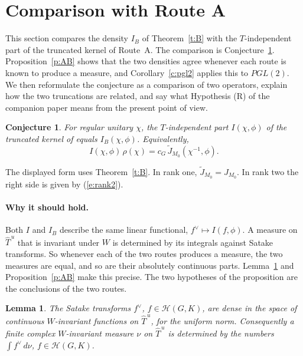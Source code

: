 \documentclass[12pt,letterpaper]{article}
\numberwithin{equation}{section}
\theoremstyle{plain}
\newtheorem{lemma}[theorem]{Lemma}
\newtheorem{conjecture}[theorem]{Conjecture}
\theoremstyle{definition}
\theoremstyle{remark}
\newcommand{\Hc}{\mathcal{H}}
\newcommand{\Thu}{\widehat{T}^{\,u}}
\begin{document}
\section{Comparison with Route A}\label{s:compare}

This section compares the density $I_B$ of Theorem~\ref{t:B} with the $T$-independent part of the truncated kernel of Route~A. The comparison is Conjecture~\ref{c:AB}. Proposition~\ref{p:AB} shows that the two densities agree whenever each route is known to produce a measure, and Corollary~\ref{c:pgl2} applies this to $PGL(2)$. We then reformulate the conjecture as a comparison of two operators, explain how the two truncations are related, and say what Hypothesis (R) of the companion paper means from the present point of view.

\begin{conjecture}\label{c:AB}
For regular unitary $\chi$, the $T$-independent part $I(\chi,\phi)$ of the truncated kernel of \cite[Prop.~4.2]{JC26} equals $I_B(\chi,\phi)$. Equivalently,
\[
I(\chi,\phi)\,\rho(\chi)=c_G\,\widetilde J_{M_0}(\chi^{-1},\phi).
\]
\end{conjecture}

The displayed form uses Theorem~\ref{t:B}. In rank one, $\widetilde J_{M_0}=J_{M_0}$. In rank two the right side is given by (\ref{e:rank2}).

\paragraph{Why it should hold.} Both $I$ and $I_B$ describe the same linear functional, $f^\vee\mapsto I(f,\phi)$. A measure on $\Thu$ that is invariant under $W$ is determined by its integrals against Satake transforms. So whenever each of the two routes produces a measure, the two measures are equal, and so are their absolutely continuous parts. Lemma~\ref{l:dense} and Proposition~\ref{p:AB} make this precise. The two hypotheses of the proposition are the conclusions of the two routes.

\begin{lemma}\label{l:dense}
The Satake transforms $f^\vee$, $f\in\Hc(G,K)$, are dense in the space of continuous $W$-invariant functions on $\Thu$, for the uniform norm. Consequently a finite complex $W$-invariant measure $\nu$ on $\Thu$ is determined by the numbers $\int f^\vee\,d\nu$, $f\in\Hc(G,K)$.
\end{lemma}
\end{document}
